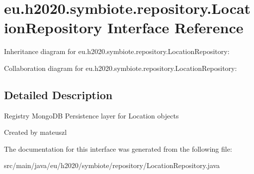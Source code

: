 \hypertarget{interfaceeu_1_1h2020_1_1symbiote_1_1repository_1_1LocationRepository}{}\section{eu.\+h2020.\+symbiote.\+repository.\+Location\+Repository Interface Reference}
\label{interfaceeu_1_1h2020_1_1symbiote_1_1repository_1_1LocationRepository}


Inheritance diagram for eu.\+h2020.\+symbiote.\+repository.\+Location\+Repository\+:


Collaboration diagram for eu.\+h2020.\+symbiote.\+repository.\+Location\+Repository\+:


\subsection{Detailed Description}
Registry Mongo\+DB Persistence layer for Location objects

Created by mateuszl 

The documentation for this interface was generated from the following file\+:\begin{DoxyCompactItemize}
\item 
src/main/java/eu/h2020/symbiote/repository/Location\+Repository.\+java\end{DoxyCompactItemize}
